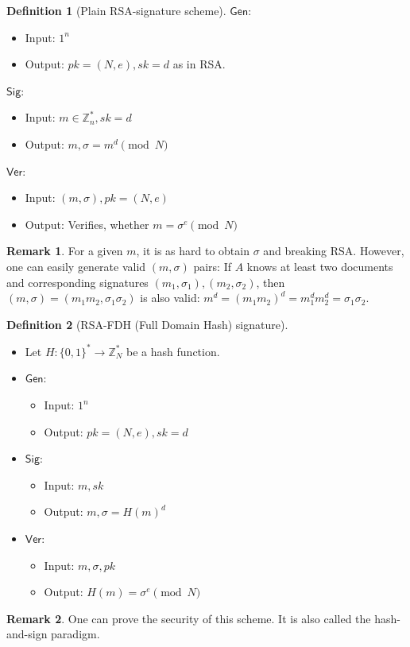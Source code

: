 \documentclass[11pt]{article}
\theoremstyle{definition}
\newtheorem{definition}{Definition}[section]
\newtheorem{remark}{Remark}[section]
\theoremstyle{proof}
\newcommand{\Gen}{\mathsf{Gen}}
\newcommand{\Sig}{\mathsf{Sig}}
\newcommand{\Ver}{\mathsf{Ver}}
\begin{document}
	\begin{definition}[Plain RSA-signature scheme]
		\item $\Gen$:
		\begin{itemize}
			\item Input: $1^n$
			\item Output: $pk = (N, e), sk = d$ as in RSA.
		\end{itemize}
		\item $\Sig$:
		\begin{itemize}
			\item Input: $m \in \mathbb{Z}_n^*, sk = d$
			\item Output: $m, \sigma = m^d \pmod{N}$
		\end{itemize}
		\item $\Ver$:
		\begin{itemize}
			\item Input: $(m, \sigma), pk = (N, e)$
			\item Output: Verifies, whether $m = \sigma^e \pmod{N}$
		\end{itemize}
	\end{definition}
	
	\begin{remark}
		For a given $m$, it is as hard to obtain $\sigma$ and breaking RSA. However, one can easily generate valid $(m, \sigma)$ pairs: If $A$ knows at least two documents and corresponding signatures $(m_1, \sigma_1), (m_2, \sigma_2)$, then $(m, \sigma) = (m_1m_2, \sigma_1\sigma_2)$ is also valid: $m^d = (m_1m_2)^d = m_1^dm_2^d=\sigma_1\sigma_2$.
	\end{remark}
	
	\begin{definition}[RSA-FDH (Full Domain Hash) signature]
		\leavevmode
		\begin{itemize}
			\item Let $H: \{0, 1\}^* \rightarrow \mathbb{Z}_N^*$ be a hash function.
			\item $\Gen$:
			\begin{itemize}
				\item Input: $1^n$
				\item Output: $pk = (N, e), sk = d$
			\end{itemize}
			\item $\Sig$:
			\begin{itemize}
				\item Input: $m, sk$
				\item Output: $m, \sigma = H(m)^d$
			\end{itemize}
			\item $\Ver$:
			\begin{itemize}
				\item Input: $m, \sigma, pk$
				\item Output: $H(m) = \sigma^e \pmod{N}$
			\end{itemize}
		\end{itemize}
	\end{definition}
	
	\begin{remark}
		One can prove the security of this scheme. It is also called the hash-and-sign paradigm.
	\end{remark}
		
\end{document}
